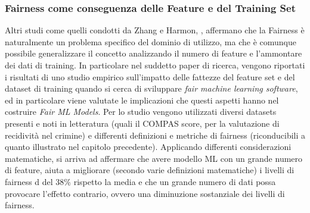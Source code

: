 \subsubsection{Fairness come conseguenza delle Feature e del Training Set}
Altri studi come quelli condotti da Zhang e Harmon, \cite{Ignorance&Prejudice}, affermano che la Fairness è naturalmente un problema specifico del dominio di utilizzo, ma che è comunque possibile generalizzare il concetto analizzando il numero di feature e l'ammontare dei dati di training. In particolare nel suddetto paper di ricerca, vengono riportati i risultati di uno studio empirico sull'impatto delle fattezze del  feature set e del dataset di training quando si cerca di sviluppare \textit{fair machine learning software}, ed in particolare viene valutate le implicazioni che questi aspetti hanno nel costruire \textit{Fair ML Models}. Per lo studio vengono utilizzati diversi datasets presenti e noti in letteratura (quali il COMPAS score, per la valutazione di recidività nel crimine) e differenti definizioni e metriche di fairness (riconducibili a quanto illustrato nel capitolo precedente). Applicando differenti considerazioni matematiche, si arriva ad affermare che avere modello ML con un grande numero di feature, aiuta a migliorare (secondo varie definizioni matematiche) i livelli di fairness d del 38\% rispetto la media e che un grande numero di dati possa provocare l'effetto contrario, ovvero una diminuzione sostanziale dei livelli di fairness.


